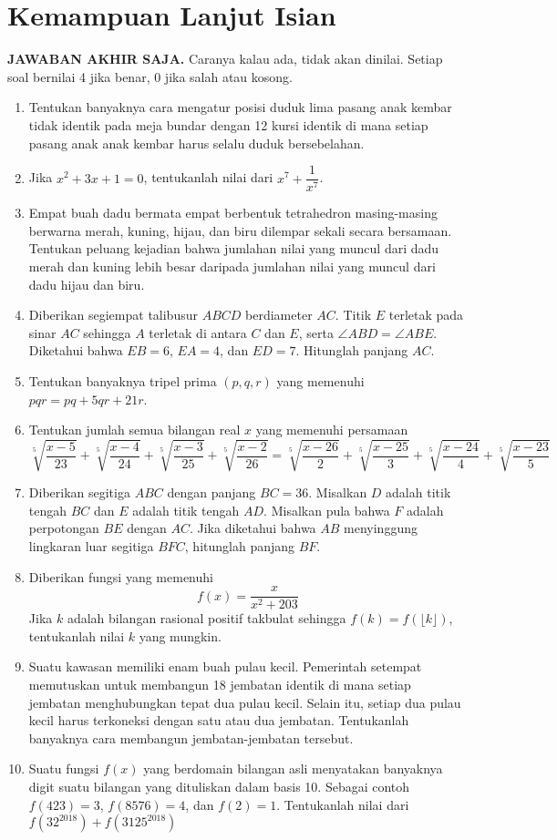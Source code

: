 \documentclass[11pt]{scrartcl}
\begin{document}
\section{Kemampuan Lanjut Isian}
\textbf{JAWABAN AKHIR SAJA.} Caranya kalau ada, tidak akan dinilai. Setiap soal bernilai 4 jika benar, 0 jika salah atau kosong.
\begin{enumerate}[resume] 
    
    \item Tentukan banyaknya cara mengatur posisi duduk lima pasang anak kembar tidak identik pada meja bundar dengan 12 kursi identik di mana setiap pasang anak anak kembar harus selalu duduk bersebelahan.
    \item Jika $x^2 + 3x + 1 = 0$, tentukanlah nilai dari $x^7+\dfrac{1}{x^7}$.
    \item Empat buah dadu bermata empat berbentuk tetrahedron masing-masing berwarna merah, kuning, hijau, dan biru dilempar sekali secara bersamaan. Tentukan peluang kejadian bahwa jumlahan nilai yang muncul dari dadu merah dan kuning lebih besar daripada jumlahan nilai yang muncul dari dadu hijau dan biru.
    \item Diberikan segiempat talibusur $ABCD$ berdiameter $AC$. Titik $E$ terletak pada sinar $AC$ sehingga $A$ terletak di antara $C$ dan $E$, serta $\angle ABD = \angle ABE$. Diketahui bahwa $EB = 6$, $EA = 4$, dan $ED = 7$. Hitunglah panjang $AC$.
    \item Tentukan banyaknya tripel prima $(p, q, r)$ yang memenuhi $pqr = pq + 5qr + 21r$.
    \item Tentukan jumlah semua bilangan real $x$ yang memenuhi persamaan
        $$\sqrt[5]{\dfrac{x - 5}{23}} + \sqrt[5]{\dfrac{x - 4}{24}} + \sqrt[5]{\dfrac{x - 3}{25}} + \sqrt[5]{\dfrac{x - 2}{26}} = \sqrt[5]{\dfrac{x - 26}{2}} + \sqrt[5]{\dfrac{x - 25}{3}} + \sqrt[5]{\dfrac{x - 24}{4}} + \sqrt[5]{\dfrac{x - 23}{5}}$$
    \item Diberikan segitiga $ABC$ dengan panjang $BC = 36$. Misalkan $D$ adalah titik tengah $BC$ dan $E$ adalah titik tengah $AD$. Misalkan pula bahwa $F$ adalah perpotongan $BE$ dengan $AC$. Jika diketahui bahwa $AB$ menyinggung lingkaran luar segitiga $BFC$, hitunglah panjang $BF$.
    \item Diberikan fungsi yang memenuhi
        $$f(x) = \frac{x}{x^2 + 203}$$
        Jika $k$ adalah bilangan rasional positif takbulat sehingga $f(k) = f(\lfloor k \rfloor)$, tentukanlah nilai $k$ yang mungkin.
    \item Suatu kawasan memiliki enam buah pulau kecil. Pemerintah setempat memutuskan untuk membangun 18 jembatan identik di mana setiap jembatan menghubungkan tepat dua pulau kecil. Selain itu, setiap dua pulau kecil harus terkoneksi dengan satu atau dua jembatan. Tentukanlah banyaknya cara membangun jembatan-jembatan tersebut.
    \item Suatu fungsi $f(x)$ yang berdomain bilangan asli menyatakan banyaknya digit suatu bilangan yang dituliskan dalam basis 10. Sebagai contoh $f(423) = 3$, $f(8576) = 4$, dan $f(2) = 1$. Tentukanlah nilai dari $f(32^{2018}) + f(3125^{2018})$
\end{enumerate}
\end{document}
